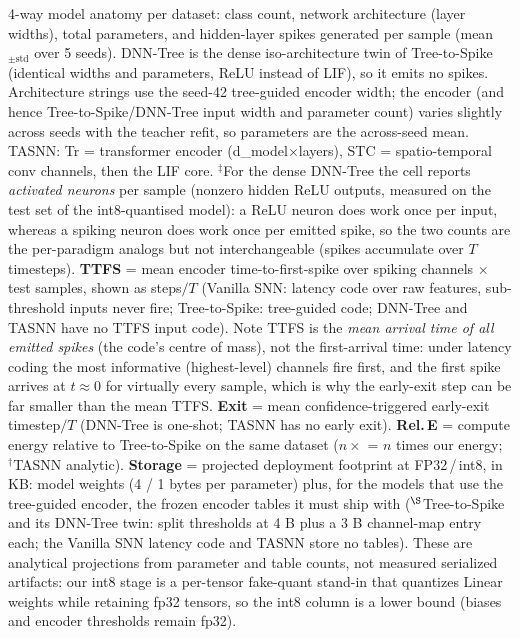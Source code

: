 \begin{table}[!ht]
\centering
\renewcommand{\arraystretch}{1.05}
\caption{4-way model anatomy per dataset: class count, network architecture (layer widths), total parameters, and hidden-layer spikes generated per sample (mean$_{\pm\text{std}}$ over 5 seeds). DNN-Tree is the dense iso-architecture twin of Tree-to-Spike (identical widths and parameters, ReLU instead of LIF), so it emits no spikes. Architecture strings use the seed-42 tree-guided encoder width; the encoder (and hence Tree-to-Spike/DNN-Tree input width and parameter count) varies slightly across seeds with the teacher refit, so parameters are the across-seed mean. TASNN: Tr = transformer encoder (d\_model$\times$layers), STC = spatio-temporal conv channels, then the LIF core. $^\ddagger$For the dense DNN-Tree the cell reports \emph{activated neurons} per sample (nonzero hidden ReLU outputs, measured on the test set of the int8-quantised model): a ReLU neuron does work once per input, whereas a spiking neuron does work once per emitted spike, so the two counts are the per-paradigm analogs but not interchangeable (spikes accumulate over $T$ timesteps). \textbf{TTFS} = mean encoder time-to-first-spike over spiking channels $\times$ test samples, shown as steps$/T$ (Vanilla SNN: latency code over raw features, sub-threshold inputs never fire; Tree-to-Spike: tree-guided code; DNN-Tree and TASNN have no TTFS input code). Note TTFS is the \emph{mean arrival time of all emitted spikes} (the code's centre of mass), not the first-arrival time: under latency coding the most informative (highest-level) channels fire first, and the first spike arrives at $t \approx 0$ for virtually every sample, which is why the early-exit step can be far smaller than the mean TTFS. \textbf{Exit} = mean confidence-triggered early-exit timestep$/T$ (DNN-Tree is one-shot; TASNN has no early exit). \textbf{Rel.\,E} = compute energy relative to Tree-to-Spike on the same dataset ($n\times$ = $n$ times our energy; $^\dagger$TASNN analytic). \textbf{Storage} = projected deployment footprint at FP32\,/\,int8, in KB: model weights (4 / 1 bytes per parameter) plus, for the models that use the tree-guided encoder, the frozen encoder tables it must ship with ($^{\S}$Tree-to-Spike and its DNN-Tree twin: split thresholds at 4 B plus a 3 B channel-map entry each; the Vanilla SNN latency code and TASNN store no tables). These are analytical projections from parameter and table counts, not measured serialized artifacts: our int8 stage is a per-tensor fake-quant stand-in that quantizes Linear weights while retaining fp32 tensors, so the int8 column is a lower bound (biases and encoder thresholds remain fp32).}

\end{table}
